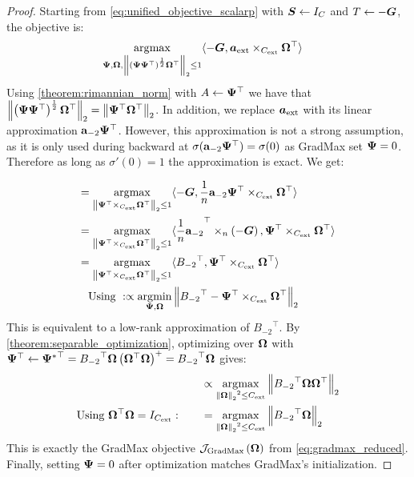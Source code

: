 \begin{proof}

Starting from \autoref{eq:unified_objective_scalarp} with
\(\boldsymbol{S} \leftarrow I_{C}\) and \(T \leftarrow - \boldsymbol{G}\), the
objective is: \[\begin{aligned}
\operatorname*{\arg\!\max}_{\boldsymbol{\Psi}{},\boldsymbol{\Omega}{},\left\| {\left( \boldsymbol{\Psi}{}\boldsymbol{\Psi}{}^{\top} \right)^{\frac{1}{2}}\boldsymbol{\Omega}{}^{\top}} \right\|_{2} \leq 1} & {\langle - \boldsymbol{G},\boldsymbol{a_{\text{ext}}} \times_{C_{\text{ext}}}\boldsymbol{\Omega}{}^{\top}\rangle}
\end{aligned}\] Using \autoref{theorem:rimannian_norm} with
\(A \leftarrow \boldsymbol{\Psi}{}^{\top}\) we have that
\(\left\| {\left( \boldsymbol{\Psi}{}\boldsymbol{\Psi}{}^{\top} \right)^{\frac{1}{2}}\boldsymbol{\Omega}{}^{\top}} \right\|_{2} = \left\| {\boldsymbol{\Psi}{}^{\top}\boldsymbol{\Omega}{}^{\top}} \right\|_{2}\).
In addition, we replace \(\boldsymbol{a_{\text{ext}}}\) with its linear approximation
\(\mathbf{a}_{- 2}\boldsymbol{\Psi}{}^{\top}\). However, this approximation is not a
strong assumption, as it is only used during backward at
\(\sigma(\mathbf{a}_{- 2}\boldsymbol{\Psi}{}^{\top}) = \sigma(0)\) as GradMax set
\(\boldsymbol{\Psi}{} = 0\). Therefore as long as \(\sigma'(0) = 1\) the
approximation is exact. We get:

\[\begin{aligned}
 = \operatorname*{\arg\!\max}_{\left\| {\boldsymbol{\Psi}{}^{\top} \times_{C_{\text{ext}}}\boldsymbol{\Omega}{}^{\top}} \right\|_{2} \leq 1} & {\langle - \boldsymbol{G},\frac{1}{n}\mathbf{a}_{- 2}\boldsymbol{\Psi}{}^{\top} \times_{C_{\text{ext}}}\boldsymbol{\Omega}{}^{\top}\rangle} \\
 = \operatorname*{\arg\!\max}_{\left\| {\boldsymbol{\Psi}{}^{\top} \times_{C_{\text{ext}}}\boldsymbol{\Omega}{}^{\top}} \right\|_{2} \leq 1} & {\langle{\frac{1}{n}\mathbf{a}_{- 2}}^{\top} \times_{n}\left( - \boldsymbol{G} \right),\boldsymbol{\Psi}{}^{\top} \times_{C_{\text{ext}}}\boldsymbol{\Omega}{}^{\top}\rangle} \\
 = \operatorname*{\arg\!\max}_{\left\| {\boldsymbol{\Psi}{}^{\top} \times_{C_{\text{ext}}}\boldsymbol{\Omega}{}^{\top}} \right\|_{2} \leq 1} & {\langle{B_{- 2}}^{\top},\boldsymbol{\Psi}{}^{\top} \times_{C_{\text{ext}}}\boldsymbol{\Omega}{}^{\top}\rangle} \\
\text{Using}\ {}: \propto \operatorname*{\arg\!\min}_{\boldsymbol{\Psi}{},\boldsymbol{\Omega}{}} & \left\| {{B_{- 2}}^{\top} - \boldsymbol{\Psi}{}^{\top} \times_{C_{\text{ext}}}\boldsymbol{\Omega}{}^{\top}} \right\|_{2}
\end{aligned}\]
This is equivalent to a low-rank approximation of \({B_{- 2}}^{\top}\).
By \autoref{theorem:separable_optimization}, optimizing over \(\boldsymbol{\Omega}{}\)
with
\(\boldsymbol{\Psi}{}^{\top} \leftarrow {\boldsymbol{\Psi}{}^{\ast}}^{\top} = {B_{- 2}}^{\top}\boldsymbol{\Omega}{}\left( \boldsymbol{\Omega}{}^{\top}\boldsymbol{\Omega}{} \right)^{+} = {B_{- 2}}^{\top}\boldsymbol{\Omega}{}\)
gives: \[\begin{aligned}
 & \propto \operatorname*{\arg\!\max}_{{\left\| \boldsymbol{\Omega}{} \right\|_{2}}^{2} \leq C_{\text{ext}}}\left\| {{B_{- 2}}^{\top}\boldsymbol{\Omega}{}\boldsymbol{\Omega}{}^{\top}} \right\|_{2} \\
\text{Using}\ {\boldsymbol{\Omega}{}^{\top}\boldsymbol{\Omega}{} = I_{C_{\text{ext}}}}:\qquad & = \operatorname*{\arg\!\max}_{{\left\| \boldsymbol{\Omega}{} \right\|_{2}}^{2} \leq C_{\text{ext}}}\left\| {{B_{- 2}}^{\top}\boldsymbol{\Omega}{}} \right\|_{2}
\end{aligned}\]
This is exactly the GradMax objective
\(\mathcal{J}_{\text{GradMax}}\left( \boldsymbol{\Omega}{} \right)\) from
\autoref{eq:gradmax_reduced}. Finally, setting \(\boldsymbol{\Psi}{} = 0\) after
optimization matches GradMax's initialization.

\end{proof}

